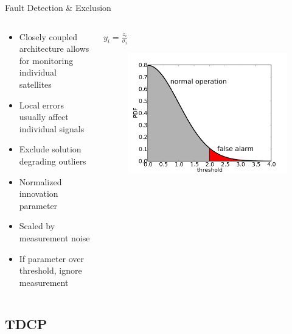 \documentclass{beamer}
\begin{document}
    \begin{frame}{Fault Detection \& Exclusion}
      \begin{columns}
        \begin{column}{0.5\linewidth}
          \begin{itemize} \footnotesize
            \item Closely coupled architecture allows for monitoring individual satellites
            \item Local errors usually affect individual signals
            \item Exclude solution degrading outliers
            \item Normalized innovation parameter
            \item Scaled by measurement noise
            \item If parameter over threshold, ignore measurement
          \end{itemize}
        \end{column}
        \begin{column}{0.5\linewidth}
          \Large \centering $y_i=\frac{z_i}{\sigma_i}$
          \begin{figure}
            \includegraphics[width=\textwidth]{../graphics/fde_plot.png}
          \end{figure}
        \end{column}
      \end{columns}
    \end{frame}


  \subsection{TDCP}
\end{document}
